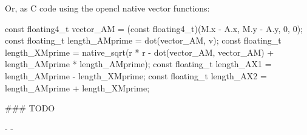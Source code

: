 Or, as C code using the opencl native vector functions:

\begin{ccode}
  const floating4_t vector_AM = (const floating4_t)(M.x - A.x, M.y - A.y, 0, 0);
  const floating_t length_AMprime = dot(vector_AM, v);
  const floating_t length_XMprime = native_sqrt(r * r - dot(vector_AM, vector_AM) + length_AMprime * length_AMprime);
  const floating_t length_AX1 = length_AMprime - length_XMprime;
  const floating_t length_AX2 = length_AMprime + length_XMprime;
\end{ccode}


### TODO

- 
- 

